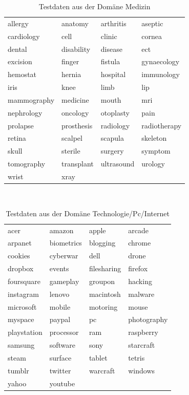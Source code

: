 \documentclass[12pt,a4paper]{report}
\begin{document}
\begin{table}[H]
\caption{Testdaten aus der Domäne Medizin}
\begin{center}
\begin{tabular}{l|l|l|l}
allergy & anatomy & arthritis & aseptic\\
cardiology & cell & clinic & cornea\\
dental & disability & disease & ect\\
excision & finger & fistula & gynaecology\\
hemostat & hernia & hospital & immunology\\
iris & knee & limb & lip\\
mammography & medicine & mouth & mri\\
nephrology & oncology & otoplasty & pain\\
prolapse & prosthesis & radiology & radiotherapy\\
retina & scalpel & scapula & skeleton\\
skull & sterile & surgery & symptom\\
tomography & transplant & ultrasound & urology\\
wrist & xray &  & \\
\end{tabular}\\
\end{center}
\end{table}

\begin{table}[H]
\caption{Testdaten aus der Domäne Technologie/Pc/Internet}
\begin{center}
\begin{tabular}{l|l|l|l}
acer & amazon & apple & arcade\\
arpanet & biometrics & blogging & chrome\\
cookies & cyberwar & dell & drone\\
dropbox & events & filesharing & firefox\\
foursquare & gameplay & groupon & hacking\\
instagram & lenovo & macintosh & malware\\
microsoft & mobile & motoring & mouse\\
myspace & paypal & pc & photography\\
playstation & processor & ram & raspberry\\
samsung & software & sony & starcraft\\
steam & surface & tablet & tetris\\
tumblr & twitter & warcraft & windows\\
yahoo & youtube &  & \\
\end{tabular}\\
\end{center}
\end{table}
\end{document}
